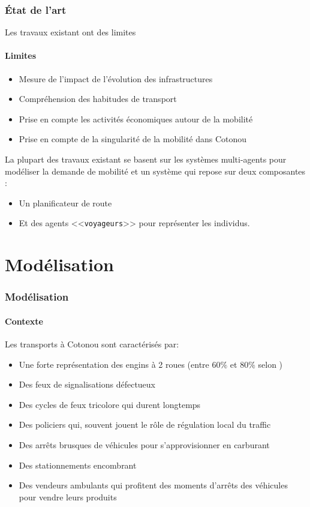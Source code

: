 \begin{frame}
    \frametitle{État de l'art}
    Les travaux existant ont des limites
    \framesubtitle{Limites}
    \begin{itemize}
        \item {} Mesure de l'impact de l'évolution des infrastructures
        \item {} Compréhension des habitudes de transport
        \item {} Prise en compte les activités économiques autour de la mobilité
        \item {} Prise en compte de la singularité de la mobilité dans Cotonou
    \end{itemize}

    \pause{}
    La plupart des travaux existant se basent sur les systèmes multi-agents pour modéliser la demande de mobilité et un système qui repose sur deux composantes :
    \begin{itemize}
        \item Un planificateur de route
        \item Et des agents <<\texttt{voyageurs}>> pour représenter les individus.
    \end{itemize}
\end{frame}


\section{Modélisation}\label{modelisation}

\begin{frame}
    \frametitle{Modélisation}
    \framesubtitle{Contexte}
    Les transports à Cotonou sont caractérisés par:
    \begin{itemize}
        \item Une forte représentation des engins à 2 roues (entre $60\%$ et $80\%$ selon \textcite{briod2011zemidjan})
        \item Des feux de signalisations défectueux
        \item Des cycles de feux tricolore qui durent longtemps
        \item Des policiers qui, souvent jouent le rôle de régulation local du traffic
        \item Des arrêts brusques de véhicules pour s'approvisionner en carburant
        \item Des stationnements encombrant
        \item Des vendeurs ambulants qui profitent des moments d'arrêts des véhicules pour vendre leurs produits
    \end{itemize}

\end{frame}

